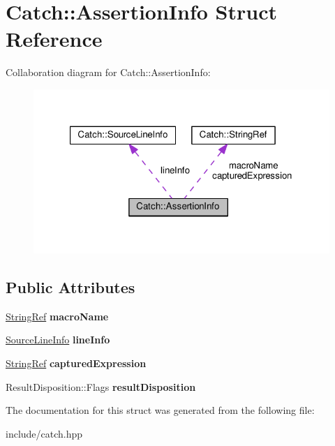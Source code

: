 \hypertarget{structCatch_1_1AssertionInfo}{}\section{Catch\+:\+:Assertion\+Info Struct Reference}
\label{structCatch_1_1AssertionInfo}


Collaboration diagram for Catch\+:\+:Assertion\+Info\+:
\nopagebreak
\begin{figure}[H]
\begin{center}
\leavevmode
\includegraphics[width=321pt]{structCatch_1_1AssertionInfo__coll__graph}
\end{center}
\end{figure}
\subsection*{Public Attributes}
\begin{DoxyCompactItemize}
\item 
\hyperlink{classCatch_1_1StringRef}{String\+Ref} {\bfseries macro\+Name}\hypertarget{structCatch_1_1AssertionInfo_aaf3fbb9f1fe09c879ba3d877584e3056}{}\label{structCatch_1_1AssertionInfo_aaf3fbb9f1fe09c879ba3d877584e3056}

\item 
\hyperlink{structCatch_1_1SourceLineInfo}{Source\+Line\+Info} {\bfseries line\+Info}\hypertarget{structCatch_1_1AssertionInfo_a17bdbb404ba12658034f833be2f4c3e7}{}\label{structCatch_1_1AssertionInfo_a17bdbb404ba12658034f833be2f4c3e7}

\item 
\hyperlink{classCatch_1_1StringRef}{String\+Ref} {\bfseries captured\+Expression}\hypertarget{structCatch_1_1AssertionInfo_accd36744b4acaa3a691a72df0b42190f}{}\label{structCatch_1_1AssertionInfo_accd36744b4acaa3a691a72df0b42190f}

\item 
Result\+Disposition\+::\+Flags {\bfseries result\+Disposition}\hypertarget{structCatch_1_1AssertionInfo_a60353b3632ab2f827162f2b2d6911073}{}\label{structCatch_1_1AssertionInfo_a60353b3632ab2f827162f2b2d6911073}

\end{DoxyCompactItemize}


The documentation for this struct was generated from the following file\+:\begin{DoxyCompactItemize}
\item 
include/catch.\+hpp\end{DoxyCompactItemize}
